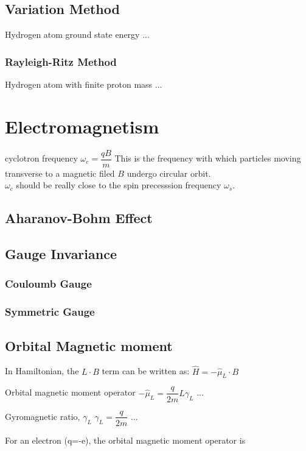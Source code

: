\documentclass[12pt,a4paper]{article}
\begin{document}
\subsection{Variation Method}
\begin{example}
    {Hydrogen atom ground state energy}
    {...}
\end{example}
\subsubsection{Rayleigh-Ritz Method}
\begin{example}
    {Hydrogen atom with finite proton mass}
    {...}
\end{example}
\section{Electromagnetism}
\begin{definition}
    {cyclotron frequency}
    {$\omega_c= \dfrac{qB}{m}$}
    {
    This is the frequency with which particles moving transverse to a magnetic filed $B$ undergo circular orbit.\\
    $\omega_c$ should be really close to the spin precesssion frequency $\omega_s$.
    }
\end{definition}
\subsection{Aharanov-Bohm Effect}
\subsection{Gauge Invariance}
\subsubsection{Couloumb Gauge}
\subsubsection{Symmetric Gauge}
\subsection{Orbital Magnetic moment}
In Hamiltonian, the $L\cdot B$ term can be written as:
$\hat{H} = - \hat{\mu}_L\cdot B$
\begin{definition}
    {Orbital magnetic moment operator}
    {$- \hat{\mu}_L = \dfrac{q}{2m}\hat{L} \gamma_L$}
    {...}
\end{definition}
\begin{definition}
    {Gyromagnetic ratio, $\gamma_L$}
    {$\gamma_L = \dfrac{q}{2m}$}
    {...}
\end{definition}
For an electron (q=-e), the orbital magnetic moment operator is 
\end{document}
